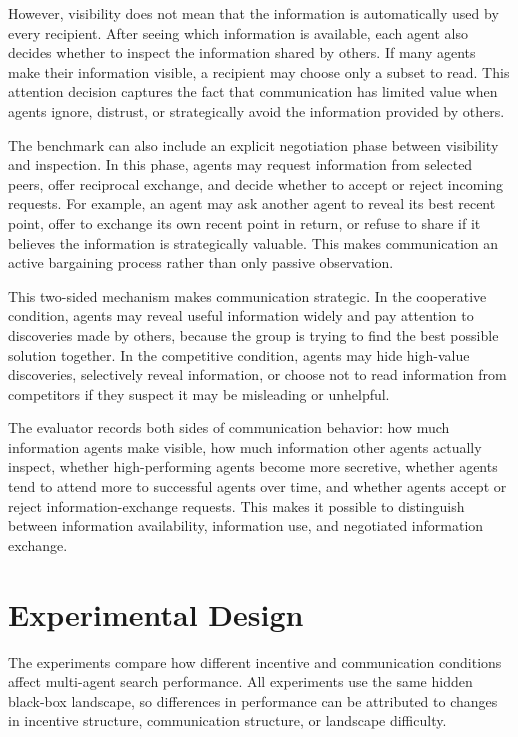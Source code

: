 \documentclass[11pt]{article}
\begin{document}
However, visibility does not mean that the information is automatically used by every recipient. After seeing which information is available, each agent also decides whether to inspect the information shared by others. If many agents make their information visible, a recipient may choose only a subset to read. This attention decision captures the fact that communication has limited value when agents ignore, distrust, or strategically avoid the information provided by others.

The benchmark can also include an explicit negotiation phase between visibility and inspection. In this phase, agents may request information from selected peers, offer reciprocal exchange, and decide whether to accept or reject incoming requests. For example, an agent may ask another agent to reveal its best recent point, offer to exchange its own recent point in return, or refuse to share if it believes the information is strategically valuable. This makes communication an active bargaining process rather than only passive observation.

This two-sided mechanism makes communication strategic. In the cooperative condition, agents may reveal useful information widely and pay attention to discoveries made by others, because the group is trying to find the best possible solution together. In the competitive condition, agents may hide high-value discoveries, selectively reveal information, or choose not to read information from competitors if they suspect it may be misleading or unhelpful.

The evaluator records both sides of communication behavior: how much information agents make visible, how much information other agents actually inspect, whether high-performing agents become more secretive, whether agents tend to attend more to successful agents over time, and whether agents accept or reject information-exchange requests. This makes it possible to distinguish between information availability, information use, and negotiated information exchange.

\section{Experimental Design}

The experiments compare how different incentive and communication conditions affect multi-agent search performance. All experiments use the same hidden black-box landscape, so differences in performance can be attributed to changes in incentive structure, communication structure, or landscape difficulty.
\end{document}
